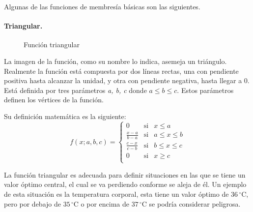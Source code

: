 Algunas de las funciones de membresía básicas son las siguientes.

\paragraph{Triangular.}
\begin{figure}
	\vspace{-\baselineskip}
	\captionsetup{margin=0.2cm,justification=centering}	
	\caption{Función triangular}
	\label{fig:trimf}
\end{figure}
La imagen de la función, como su nombre lo indica, asemeja un triángulo. Realmente la función está compuesta por dos líneas rectas, una con pendiente positiva hasta alcanzar la unidad, y otra con pendiente negativa, hasta llegar a 0. Está definida por tres parámetros \textit{a, b, c} donde $ a \leq b \leq c$. Estos parámetros definen los vértices de la función.

Su definición matemática es la siguiente:
$$  f(x;a,b,c)= \left\lbrace \begin{array}{lcl}
0	& \mbox{si} & x  \leq a \\ [.30cm]
{\displaystyle \frac{x-a}{b-a}} & \mbox{si} & a \leq x \leq b \\ [.45cm]
{\displaystyle \frac{c-x}{c-b}} & \mbox{si} & b \leq x \leq c \\ [.45cm]
0 & \mbox{si} & x \geq c \\
\end{array}				
\right.
$$

La función triangular es adecuada para definir situaciones en las que se tiene un valor óptimo central, el cual se va perdiendo conforme se aleja de él. Un ejemplo de esta situación es la temperatura corporal, esta tiene un valor óptimo de $36\,^{\circ}\mathrm{C}$, pero por debajo de $35\,^{\circ}\mathrm{C}$ o por encima de $37\,^{\circ}\mathrm{C}$ se podría considerar peligrosa.


